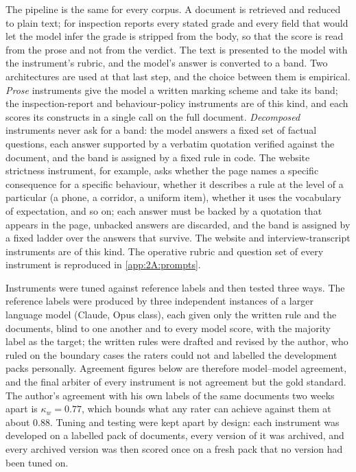 The pipeline is the same for every corpus. A document is retrieved and
reduced to plain text; for inspection reports every stated grade and every
field that would let the model infer the grade is stripped from the body,
so that the score is read from the prose and not from the verdict. The text
is presented to the model with the instrument's rubric, and the model's answer
is converted to a band. Two architectures are used at that last step, and the
choice between them is empirical. \emph{Prose} instruments give the model a
written marking scheme and take its band; the inspection-report and
behaviour-policy instruments are of this kind, and each scores its constructs
in a single call on the full document. \emph{Decomposed} instruments never ask
for a band: the model answers a fixed set of factual questions, each answer
supported by a verbatim quotation verified against the document, and the band
is assigned by a fixed rule in code. The website strictness instrument, for
example, asks whether the page names a specific consequence for a specific
behaviour, whether it describes a rule at the level of a particular (a phone,
a corridor, a uniform item), whether it uses the vocabulary of expectation,
and so on; each answer must be backed by a quotation that appears in the
page, unbacked answers are discarded, and the band is assigned by a fixed
ladder over the answers that survive. The website and interview-transcript instruments are of this kind.
The operative rubric and question set of every instrument is reproduced in
\cref{app:2A:prompts}.

Instruments were tuned against reference labels and then tested three ways.
The reference labels were produced by three independent instances of a
larger language model (Claude, Opus class), each given only the written rule
and the documents, blind to one another and to every model score, with the
majority label as the target; the written rules were drafted and revised by
the author, who ruled on the boundary cases the raters could not and
labelled the development packs personally. Agreement figures below are
therefore model--model agreement, and the final arbiter of every instrument
is not agreement but the gold standard. The author's agreement with his own
labels of the same documents two weeks apart is $\kappa_w = 0.77$, which
bounds what any rater can achieve against them at about $0.88$. Tuning and
testing were kept apart by design: each instrument was developed on a
labelled pack of documents, every version of it was archived, and every
archived version was then scored once on a fresh pack that no version had
been tuned on.


